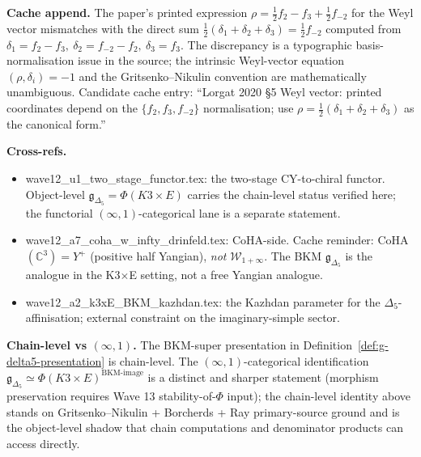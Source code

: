 \documentclass[11pt]{article}
\theoremstyle{definition}
\providecommand{\C}{\mathbb{C}}
\providecommand{\g}{\mathfrak{g}}
\providecommand{\Deltafive}{\Delta_5}
\begin{document}
\textbf{Cache append.} The paper's printed expression
$\rho=\tfrac12 f_2-f_3+\tfrac12 f_{-2}$ for the Weyl vector mismatches
with the direct sum $\tfrac12(\delta_1+\delta_2+\delta_3)=\tfrac12 f_{-2}$
computed from $\delta_1=f_2-f_3,\ \delta_2=f_{-2}-f_2,\ \delta_3=f_3$.
The discrepancy is a typographic basis-normalisation issue in the
source; the intrinsic Weyl-vector equation $(\rho,\delta_i)=-1$ and
the Gritsenko--Nikulin convention are mathematically unambiguous.
Candidate cache entry: ``Lorgat 2020 \S 5 Weyl vector: printed
coordinates depend on the $\{f_2,f_3,f_{-2}\}$ normalisation; use
$\rho=\tfrac12(\delta_1+\delta_2+\delta_3)$ as the canonical form.''

\textbf{Cross-refs.}
\begin{itemize}
\item wave12\_u1\_two\_stage\_functor.tex: the two-stage CY-to-chiral
      functor. Object-level $\g_{\Deltafive}=\Phi(K3\times E)$ carries
      the chain-level status verified here; the functorial
      $(\infty,1)$-categorical lane is a separate statement.
\item wave12\_a7\_coha\_w\_infty\_drinfeld.tex: CoHA-side. Cache
      reminder: CoHA$(\C^3)=Y^+$ (positive half Yangian), \emph{not}
      $\mathcal{W}_{1+\infty}$. The BKM $\g_{\Deltafive}$ is the
      analogue in the K3$\times$E setting, not a free Yangian analogue.
\item wave12\_a2\_k3xE\_BKM\_kazhdan.tex: the Kazhdan parameter for
      the $\Deltafive$-affinisation; external constraint on the
      imaginary-simple sector.
\end{itemize}

\textbf{Chain-level vs $(\infty,1)$.}
The BKM-super presentation in Definition~\ref{def:g-delta5-presentation}
is chain-level. The $(\infty,1)$-categorical identification
$\g_{\Deltafive}\simeq\Phi(K3\times E)^{\text{BKM-image}}$ is a
distinct and sharper statement (morphism preservation requires Wave 13
stability-of-$\Phi$ input); the chain-level identity above stands on
Gritsenko--Nikulin + Borcherds + Ray primary-source ground and is the
object-level shadow that chain computations and denominator products
can access directly.
\end{document}
